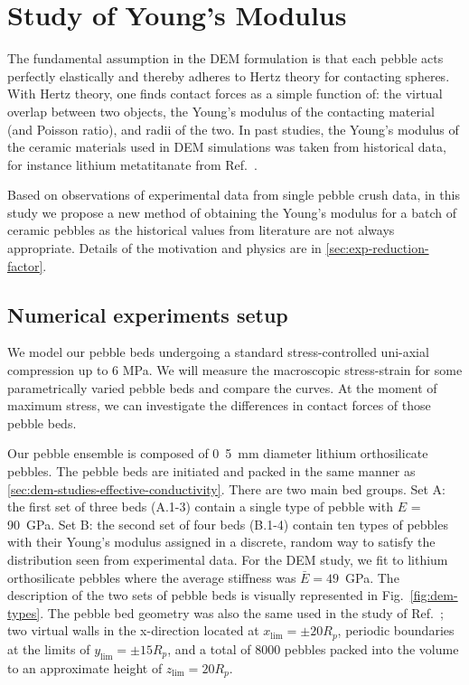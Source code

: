 \section{Study of Young's Modulus}\label{sec:dem-studies-youngs-modulus}

The fundamental assumption in the DEM formulation is that each pebble acts perfectly elastically and thereby adheres to Hertz theory for contacting spheres. With Hertz theory, one finds contact forces as a simple function of: the virtual overlap between two objects, the Young's modulus of the contacting material (and Poisson ratio), and radii of the two. In past studies, the Young's modulus of the ceramic materials  used in DEM simulations was taken from historical data, for instance lithium metatitanate from Ref.~\cite{Gierszewski1998}.

Based on observations of experimental data from single pebble crush data, in this study we propose a new method of obtaining the Young's modulus for a batch of ceramic pebbles as the historical values from literature are not always appropriate. Details of the motivation and physics are in \cref{sec:exp-reduction-factor}.



\subsection{Numerical experiments setup}
We model our pebble beds undergoing a standard stress-controlled uni-axial compression up to 6 MPa. We will measure the macroscopic stress-strain for some parametrically varied pebble beds and compare the curves. At the moment of maximum stress, we can investigate the differences in contact forces of those pebble beds.

Our pebble ensemble is composed of \si{0.5 mm} diameter lithium orthosilicate pebbles. The pebble beds are initiated and packed in the same manner as \cref{sec:dem-studies-effective-conductivity}. There are two main bed groups. Set A: the first set of three beds (A.1-3) contain a single type of pebble with $E$ = \si{90 GPa}. Set B: the second set of four beds (B.1-4) contain ten types of pebbles with their Young's modulus assigned in a discrete, random way to satisfy the distribution seen from experimental data. For the DEM study, we fit to lithium orthosilicate pebbles where the average stiffness was $\bar{E} = 49$~GPa. The description of the two sets of pebble beds is visually represented in Fig.~\ref{fig:dem-types}. The pebble bed geometry was also the same used in the study of Ref.~\cite{VanLew2014}; two virtual walls in the x-direction located at $x_\text{lim} = \pm 20 R_p$, periodic boundaries at the limits of $y_\text{lim} = \pm 15 R_p$, and a total of 8000 pebbles packed into the volume to an approximate height of $z_\text{lim} = 20 R_p$.

